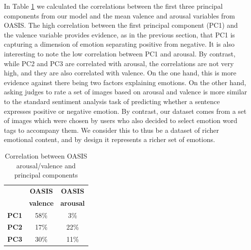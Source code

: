 \documentclass{article} %
\begin{document}
In Table \ref{table:oasis} we calculated the correlations between the first three principal components from our model and the mean valence and arousal variables from OASIS. The high correlation between the first principal component (PC1) and the valence variable provides evidence, as in the previous section, that PC1 is capturing a dimension of emotion separating positive from negative. It is also interesting to note the low correlation between PC1 and arousal. By contrast, while PC2 and PC3 are correlated with arousal, the correlations are not very high, and they are also correlated with valence. On the one hand, this is more evidence against there being two factors explaining emotions. On the other hand, asking judges to rate a set of images based on arousal and valence is more similar to the standard sentiment analysis task of predicting whether a sentence expresses positive or negative emotion. By contrast, our dataset comes from a set of images which were chosen by users who also decided to select emotion word tags to accompany them. We consider this to thus be a dataset of richer emotional content, and by design it represents a richer set of emotions.
\begin{table}[H]
\caption{Correlation between OASIS arousal/valence and principal components}
\label{table:oasis}
\begin{center}
    \begin{tabular}{ l | c | c}
    & \textbf{OASIS} & \textbf{OASIS} \\
    & \textbf{valence} & \textbf{arousal} \\ \hline
    \textbf{PC1} & 58\% & 3\% \\ \hline
    \textbf{PC2}  & 17\% & 22\%\\ \hline
    \textbf{PC3} & 30\% & 11\% \\
    \end{tabular}
\end{center} 
\end{table}
\end{document}
